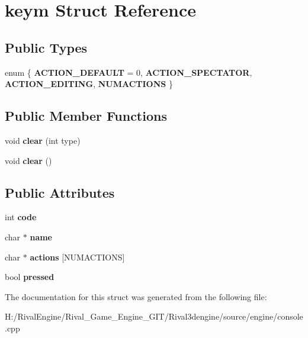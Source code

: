 \hypertarget{structkeym}{}\section{keym Struct Reference}
\label{structkeym}
\subsection*{Public Types}
\begin{DoxyCompactItemize}
\item 
\mbox{\label{structkeym_aa9583b8bee0d15c7fcbfe20a2df16dc0}} 
enum \{ {\bfseries A\+C\+T\+I\+O\+N\+\_\+\+D\+E\+F\+A\+U\+LT} = 0, 
{\bfseries A\+C\+T\+I\+O\+N\+\_\+\+S\+P\+E\+C\+T\+A\+T\+OR}, 
{\bfseries A\+C\+T\+I\+O\+N\+\_\+\+E\+D\+I\+T\+I\+NG}, 
{\bfseries N\+U\+M\+A\+C\+T\+I\+O\+NS}
 \}
\end{DoxyCompactItemize}
\subsection*{Public Member Functions}
\begin{DoxyCompactItemize}
\item 
\mbox{\label{structkeym_ab9f5321992ffcaf1b9886103646a3b76}} 
void {\bfseries clear} (int type)
\item 
\mbox{\label{structkeym_aa003e46990a170092e9f20b8e1c6d301}} 
void {\bfseries clear} ()
\end{DoxyCompactItemize}
\subsection*{Public Attributes}
\begin{DoxyCompactItemize}
\item 
\mbox{\label{structkeym_a79b5b5ff4ac7f846ffadf4412cde081e}} 
int {\bfseries code}
\item 
\mbox{\label{structkeym_a17d5ed47e49e712bb198c9b562de8f2e}} 
char $\ast$ {\bfseries name}
\item 
\mbox{\label{structkeym_a8ed40c8e7e98b31cabc1f24efe3fd623}} 
char $\ast$ {\bfseries actions} \mbox{[}N\+U\+M\+A\+C\+T\+I\+O\+NS\mbox{]}
\item 
\mbox{\label{structkeym_a5725261c9c3816f003130d28220f1ecb}} 
bool {\bfseries pressed}
\end{DoxyCompactItemize}


The documentation for this struct was generated from the following file\+:\begin{DoxyCompactItemize}
\item 
H\+:/\+Rival\+Engine/\+Rival\+\_\+\+Game\+\_\+\+Engine\+\_\+\+G\+I\+T/\+Rival3dengine/source/engine/console.\+cpp\end{DoxyCompactItemize}
